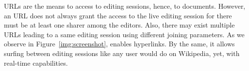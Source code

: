 URLs are the means to access to editing sessions, hence, to documents. However,
an URL does not always grant the access to the live editing session for there
must be at least one sharer among the editors. Also, there may exist multiple
URLs leading to a same editing session using different joining parameters. As we
observe in Figure~\ref{img:screenshot}, \CRATE enables hyperlinks. By the same,
it allows surfing between editing sessions like any user would do on Wikipedia,
yet, with real-time capabilities.
